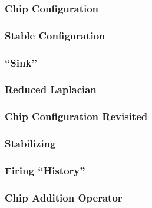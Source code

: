 \documentclass{beamer}
\begin{document}
\begin{frame}
\frametitle{Chip Configuration}


\end{frame}

\begin{frame}
\frametitle{Stable Configuration}

\end{frame}


\begin{frame}
\frametitle{``Sink''}




\end{frame}

\begin{frame}
\frametitle{Reduced Laplacian}

\end{frame}

\begin{frame}
\frametitle{Chip Configuration Revisited}

\end{frame}

\begin{frame}
\frametitle{Stabilizing}

\end{frame}


\begin{frame}
\frametitle{Firing ``History''}

\end{frame}

\begin{frame}
\frametitle{Chip Addition Operator}

\end{frame}
\end{document}

